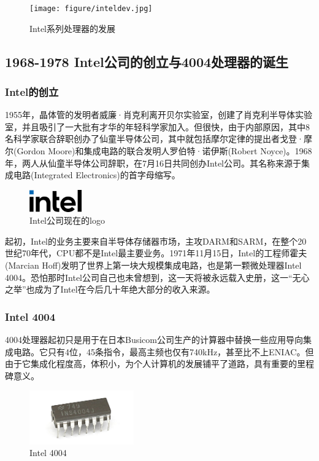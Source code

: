 \documentclass[UTF8]{ctexart}
\begin{document}
\begin{figure}[H]
    \begin{center}
        \texttt{[image: figure/inteldev.jpg]}
        \caption{Intel系列处理器的发展}
    \end{center}
\end{figure}

\subsection{1968-1978 Intel公司的创立与4004处理器的诞生}
\subsubsection{Intel的创立}
1955年，晶体管的发明者威廉·肖克利离开贝尔实验室，创建了肖克利半导体实验室，并且吸引了一大批有才华的年轻科学家加入。但很快，由于内部原因，其中8名科学家联合辞职创办了仙童半导体公司，其中就包括摩尔定律的提出者戈登·摩尔(Gordon Moore)和集成电路的联合发明人罗伯特·诺伊斯(Robert Noyce)。1968年，两人从仙童半导体公司辞职，在7月16日共同创办Intel公司。其名称来源于集成电路(Integrated Electronics)的首字母缩写。
\begin{figure}[H]
    \begin{center}
        \includegraphics[width=0.2\textwidth]{figure/intel.png}
        \caption{Intel公司现在的logo}
    \end{center}
\end{figure}
起初，Intel的业务主要来自半导体存储器市场，主攻DARM和SARM，在整个20世纪70年代，CPU都不是Intel最主要业务。1971年11月15日，Intel的工程师霍夫(Marcian Hoff)发明了世界上第一块大规模集成电路，也是第一颗微处理器Intel 4004。恐怕那时Intel公司自己也未曾想到，这一天将被永远载入史册，这一“无心之举”也成为了Intel在今后几十年绝大部分的收入来源。

\subsubsection{Intel 4004}
4004处理器起初只是用于在日本Busicom公司生产的计算器中替换一些应用导向集成电路。它只有4位，45条指令，最高主频也仅有740kHz，甚至比不上ENIAC。但由于它集成化程度高，体积小，为个人计算机的发展铺平了道路，具有重要的里程碑意义。
\begin{figure}[H]
    \begin{center}
        \includegraphics[width=0.4\textwidth]{figure/4004.jpg}
        \caption{Intel 4004}
    \end{center}
\end{figure}
\end{document}

